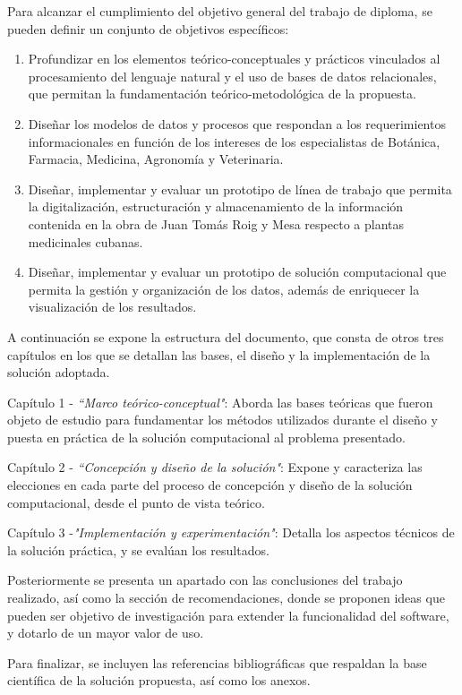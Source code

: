 Para alcanzar el cumplimiento del objetivo general del trabajo de diploma, se pueden 
definir un conjunto de objetivos específicos:
\begin{enumerate}
    \item Profundizar en los elementos teórico-conceptuales y prácticos vinculados al 
    procesamiento del lenguaje natural y el uso de bases de datos relacionales, que permitan 
    la fundamentación teórico-metodológica de la propuesta.
    \item Diseñar los modelos de datos y procesos que respondan a los requerimientos 
    informacionales en función de los intereses de los especialistas de Botánica, 
    Farmacia, Medicina, Agronomía y Veterinaria.
    \item Diseñar, implementar y evaluar un prototipo de línea de trabajo que permita 
    la digitalización, estructuración y almacenamiento de la información contenida 
    en la obra de Juan Tomás Roig y Mesa respecto a plantas medicinales cubanas.
    \item Diseñar, implementar y evaluar un prototipo de solución computacional que 
    permita la gestión y organización de los datos, además de enriquecer la visualización 
    de los resultados.
\end{enumerate}

A continuación se expone la estructura del documento, que consta de otros tres capítulos 
en los que se detallan las bases, el diseño y la implementación de la solución adoptada.

Capítulo 1 - \textit{``Marco teórico-conceptual"}: Aborda las bases teóricas que fueron 
objeto de estudio para fundamentar los métodos utilizados durante el diseño y puesta en 
práctica de la solución computacional al problema presentado.

Capítulo 2 - \textit{``Concepción y diseño de la solución"}: Expone y caracteriza las 
elecciones en cada parte del proceso de concepción y diseño de la solución computacional, 
desde el punto de vista teórico.

Capítulo 3 -\textit{"Implementación y experimentación"}: Detalla los aspectos técnicos 
de la solución práctica, y se evalúan los resultados.

Posteriormente se presenta un apartado con las conclusiones del trabajo realizado, 
así como la sección de recomendaciones, donde se proponen ideas que pueden ser objetivo 
de investigación para extender la funcionalidad del software, y dotarlo de un mayor 
valor de uso.

Para finalizar, se incluyen las referencias bibliográficas que respaldan la base 
científica de la solución propuesta, así como los anexos.